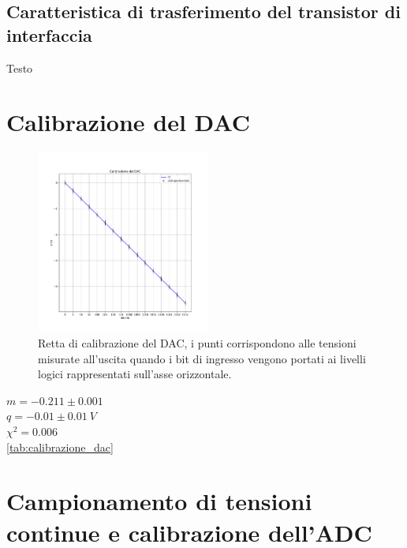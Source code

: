 \documentclass[journal]{IEEEtran}
\begin{document}
\subsection{Caratteristica di trasferimento del transistor di interfaccia}
Testo


\section{Calibrazione del DAC}

\begin{figure}[t]%
\centering
\begin{center}
\includegraphics[width=0.51\textwidth]{analysis/output/calibrazione_dac.pdf}
\end{center}
\caption{Retta di calibrazione del DAC, i punti corrispondono alle tensioni misurate all'uscita quando i bit di ingresso vengono portati ai livelli logici rappresentati sull'asse orizzontale.}
\label{fig:graph_calibrazione_dac}
\end{figure}

$ m = -0.211 \pm 0.001 $ \\
$ q = -0.01 \pm 0.01 \ V $ \\
$ \chi^{2} = 0.006 $ \\

\ref{tab:calibrazione_dac}


\section{Campionamento di tensioni continue e calibrazione dell'ADC}
\end{document}
